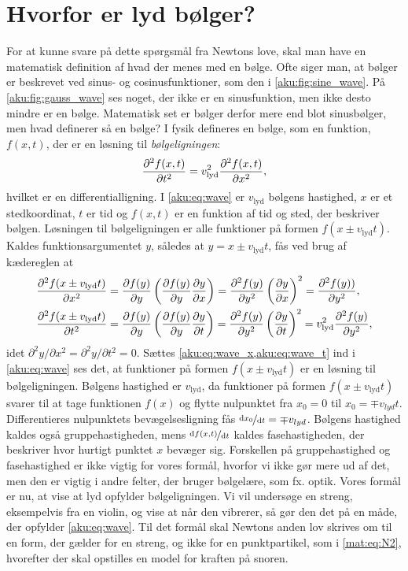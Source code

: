 \section{Hvorfor er lyd bølger?} \label{aku:sec:wave}
For at kunne svare på dette spørgsmål fra Newtons love, skal man have en matematisk definition af hvad der menes med en bølge. Ofte siger man, at bølger er beskrevet ved sinus- og cosinusfunktioner, som den i \cref{aku:fig:sine_wave}. På \cref{aku:fig:gauss_wave} ses noget, der ikke er en sinusfunktion, men ikke desto mindre er en bølge. Matematisk set er bølger derfor mere end blot sinusbølger, men hvad definerer så en bølge? I fysik defineres en bølge, som en funktion, $f(x,t)$, der er en løsning til \textit{bølgeligningen}:
%
\begin{align} \label{aku:eq:wave}
    \pdv[2]{f(x,t)}{t} = v_\mathrm{lyd}^2\pdv[2]{f(x,t)}{x},
\end{align}
%
hvilket er en differentialligning. I \cref{aku:eq:wave} er $v_\mathrm{lyd}$ bølgens hastighed, $x$ er et stedkoordinat, $t$ er tid og $f(x,t)$ er en funktion af tid og sted, der beskriver bølgen. Løsningen til bølgeligningen er alle funktioner på formen $f(x\pm v_\mathrm{lyd}t)$. Kaldes funktionsargumentet $y$, således at $y = x \pm v_\mathrm{lyd}t$, fås ved brug af kædereglen at
%
\begin{subequations}
\begin{align}
    \pdv[2]{f(x\pm v_\mathrm{lyd}t)}{x} &= \pdv{f(y)}{y}\left(\pdv{f(y)}{y}\pdv{y}{x}\right) = \pdv[2]{f(y)}{y}\left(\pdv{y}{x}\right)^2 = \pdv[2]{f(y))}{y}, \label{aku:eq:wave_x}\\
    \pdv[2]{f(x\pm v_\mathrm{lyd}t)}{t} &= \pdv{f(y)}{y}\left(\pdv{f(y)}{y}\pdv{y}{t}\right) = \pdv[2]{f(y)}{y}\left(\pdv{y}{t}\right)^2 = v_\mathrm{lyd}^2\pdv[2]{f(y)}{y}, \label{aku:eq:wave_t}
\end{align}
\end{subequations}
%
idet $\partial^2y/\partial x^2 = \partial^2y/\partial t^2 = 0$. Sættes \cref{aku:eq:wave_x,aku:eq:wave_t} ind i \cref{aku:eq:wave} ses det, at funktioner på formen $f(x\pm v_\mathrm{lyd}t)$ er en løsning til bølgeligningen. Bølgens hastighed er $v_\mathrm{lyd}$, da funktioner på formen $f(x\pm v_\mathrm{lyd}t)$ svarer til at tage funktionen $f(x)$ og flytte nulpunktet fra $x_0=0$ til $x_0=\mp v_{lyd}t$. Differentieres nulpunktets bevægelsesligning fås $\nicefrac{\dd x_0}{\dd t} = \mp v_{lyd}$. Bølgens hastighed kaldes også gruppehastigheden, mens $\nicefrac{\dd f(x,t)}{\dd t}$ kaldes fasehastigheden, der beskriver hvor hurtigt punktet $x$ bevæger sig. Forskellen på gruppehastighed og fasehastighed er ikke vigtig for vores formål, hvorfor vi ikke gør mere ud af det, men den er vigtig i andre felter, der bruger bølgelære, som fx. optik. Vores formål er nu, at vise at lyd opfylder bølgeligningen. Vi vil undersøge en streng, eksempelvis fra en violin, og vise at når den vibrerer, så gør den det på en måde, der opfylder \cref{aku:eq:wave}. Til det formål skal Newtons anden lov skrives om til en form, der gælder for en streng, og ikke for en punktpartikel, som i \cref{mat:eq:N2}, hvorefter der skal opstilles en model for kraften på snoren.

